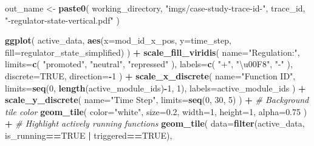 \documentclass[
]{book}
\newenvironment{Shaded}{\begin{snugshade}}{\end{snugshade}}
\newcommand{\CommentTok}[1]{\textcolor[rgb]{0.56,0.35,0.01}{\textit{#1}}}
\newcommand{\DataTypeTok}[1]{\textcolor[rgb]{0.13,0.29,0.53}{#1}}
\newcommand{\DecValTok}[1]{\textcolor[rgb]{0.00,0.00,0.81}{#1}}
\newcommand{\FloatTok}[1]{\textcolor[rgb]{0.00,0.00,0.81}{#1}}
\newcommand{\KeywordTok}[1]{\textcolor[rgb]{0.13,0.29,0.53}{\textbf{#1}}}
\newcommand{\NormalTok}[1]{#1}
\newcommand{\OperatorTok}[1]{\textcolor[rgb]{0.81,0.36,0.00}{\textbf{#1}}}
\newcommand{\OtherTok}[1]{\textcolor[rgb]{0.56,0.35,0.01}{#1}}
\newcommand{\StringTok}[1]{\textcolor[rgb]{0.31,0.60,0.02}{#1}}
\begin{document}
\begin{Shaded}
\begin{Highlighting}[]
\NormalTok{out\_name \textless{}{-}}\StringTok{ }\KeywordTok{paste0}\NormalTok{(}
\NormalTok{  working\_directory,}
  \StringTok{"imgs/case{-}study{-}trace{-}id{-}"}\NormalTok{,}
\NormalTok{   trace\_id,}
   \StringTok{"{-}regulator{-}state{-}vertical.pdf"}
\NormalTok{)}

\KeywordTok{ggplot}\NormalTok{(}
\NormalTok{    active\_data,}
    \KeywordTok{aes}\NormalTok{(}\DataTypeTok{x=}\NormalTok{mod\_id\_x\_pos, }\DataTypeTok{y=}\NormalTok{time\_step, }\DataTypeTok{fill=}\NormalTok{regulator\_state\_simplified)}
\NormalTok{  ) }\OperatorTok{+}
\StringTok{  }\KeywordTok{scale\_fill\_viridis}\NormalTok{(}
    \DataTypeTok{name=}\StringTok{"Regulation:"}\NormalTok{,}
    \DataTypeTok{limits=}\KeywordTok{c}\NormalTok{(}
      \StringTok{"promoted"}\NormalTok{,}
      \StringTok{"neutral"}\NormalTok{,}
      \StringTok{"repressed"}
\NormalTok{    ),}
    \DataTypeTok{labels=}\KeywordTok{c}\NormalTok{(}
      \StringTok{"+"}\NormalTok{,}
      \StringTok{"\textbackslash{}u00F8"}\NormalTok{,}
      \StringTok{"{-}"}
\NormalTok{    ),}
    \DataTypeTok{discrete=}\OtherTok{TRUE}\NormalTok{,}
    \DataTypeTok{direction=}\OperatorTok{{-}}\DecValTok{1}
\NormalTok{  ) }\OperatorTok{+}
\StringTok{  }\KeywordTok{scale\_x\_discrete}\NormalTok{(}
    \DataTypeTok{name=}\StringTok{"Function ID"}\NormalTok{,}
    \DataTypeTok{limits=}\KeywordTok{seq}\NormalTok{(}\DecValTok{0}\NormalTok{, }\KeywordTok{length}\NormalTok{(active\_module\_ids)}\OperatorTok{{-}}\DecValTok{1}\NormalTok{, }\DecValTok{1}\NormalTok{),}
    \DataTypeTok{labels=}\NormalTok{active\_module\_ids}
\NormalTok{  ) }\OperatorTok{+}
\StringTok{  }\KeywordTok{scale\_y\_discrete}\NormalTok{(}
    \DataTypeTok{name=}\StringTok{"Time Step"}\NormalTok{,}
    \DataTypeTok{limits=}\KeywordTok{seq}\NormalTok{(}\DecValTok{0}\NormalTok{, }\DecValTok{30}\NormalTok{, }\DecValTok{5}\NormalTok{)}
\NormalTok{  ) }\OperatorTok{+}
\StringTok{  }\CommentTok{\# Background tile color}
\StringTok{  }\KeywordTok{geom\_tile}\NormalTok{(}
    \DataTypeTok{color=}\StringTok{"white"}\NormalTok{,}
    \DataTypeTok{size=}\FloatTok{0.2}\NormalTok{,}
    \DataTypeTok{width=}\DecValTok{1}\NormalTok{,}
    \DataTypeTok{height=}\DecValTok{1}\NormalTok{,}
    \DataTypeTok{alpha=}\FloatTok{0.75}
\NormalTok{  ) }\OperatorTok{+}
\StringTok{  }\CommentTok{\# Highlight actively running functions}
\StringTok{  }\KeywordTok{geom\_tile}\NormalTok{(}
    \DataTypeTok{data=}\KeywordTok{filter}\NormalTok{(active\_data, is\_running}\OperatorTok{==}\OtherTok{TRUE} \OperatorTok{|}\StringTok{ }\NormalTok{triggered}\OperatorTok{==}\OtherTok{TRUE}\NormalTok{),}

\end{Highlighting}
\end{Shaded}
\end{document}
